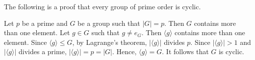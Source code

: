 \documentclass[12pt]{article}
\begin{document}
The following is a proof that every group of prime order is cyclic.

Let $p$ be a prime and $G$ be a group such that $|G|=p$.  Then $G$ contains more than one element.  Let $g \in G$ such that $g \ne e_G$.  Then $\langle g \rangle$ contains more than one element.  Since $\langle g \rangle \le G$, by Lagrange's theorem, $|\langle g \rangle |$ divides $p$.  Since $|\langle g \rangle |>1$ and $|\langle g \rangle |$ divides a prime, $|\langle g \rangle |=p=|G|$.  Hence, $\langle g \rangle =G$.  It follows that $G$ is cyclic.
\end{document}
